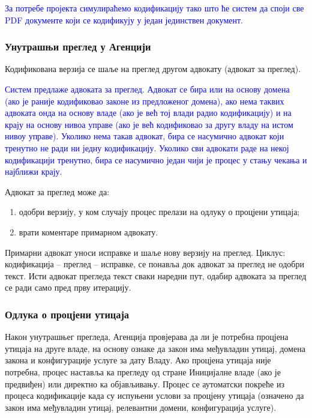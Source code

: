 \documentclass[12pt,a4paper]{article}
\newcommand{\optional}[1]{\textcolor{blue}{#1}}
\begin{document}
\optional{За потребе пројекта симулираћемо кодификацију тако што ће систем да споји све PDF документе који се кодификују у један јединствен документ.}

\subsubsection{Унутрашњи преглед у Агенцији}

Кодификована верзија се шаље на преглед другом адвокату (адвокат за преглед).

\optional{Систем предлаже адвоката за преглед. Адвокат се бира или на основу домена (ако је раније кодификовао законе из предложеног домена), ако нема таквих адвоката онда на основу владе (ако је већ тој влади радио кодификацију) и на крају на основу нивоа управе (ако је већ кодификовао за другу владу на истом нивоу управе). Уколико нема такав адвокат, бира се насумично адвокат који тренутно не ради ни једну кодификацију. Уколико сви адвокати раде на некој кодификацији тренутно, бира се насумично један чији је процес у стању чекања и најближи крају.}

Адвокат за преглед може да:
\begin{enumerate}[label=\alph*)]
    \item одобри верзију, у ком случају процес прелази на одлуку о процјени утицаја;
    \item врати коментаре примарном адвокату.
\end{enumerate}

Примарни адвокат уноси исправке и шаље нову верзију на преглед. Циклус: кодификација – преглед – исправке, се понавља док адвокат за преглед не одобри текст. Исти адвокат прегледа текст сваки наредни пут, одабир адвоката за преглед се ради само пред прву итерацију.

\subsubsection{Одлука о процјени утицаја}

Након унутрашњег прегледа, Агенција провјерава да ли је потребна процјена утицаја на друге владе, на основу ознаке да закон има међувладин утицај, домена закона и конфигурације услуге за дату Владу. Ако процјена утицаја није потребна, процес наставља ка прегледу од стране Иницијалне владе (ако је предвиђен) или директно ка објављивању. Процес се аутоматски покреће из процеса кодификације када су испуњени услови за процјену утицаја (означено да закон има међувладин утицај, релевантни домени, конфигурација услуге).
\end{document}
